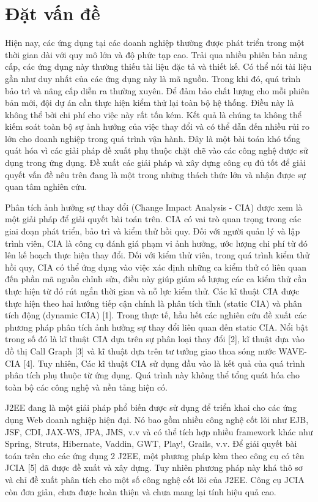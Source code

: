 \documentclass[12pt]{report}
\begin{document}
\chapter{Đặt vấn đề}
Hiện nay, các ứng dụng tại các doanh nghiệp thường được phát triển trong một thời gian
dài với quy mô lớn và độ phức tạp cao. Trải qua nhiều phiên bản nâng cấp, các ứng dụng
này thường thiếu tài liệu đặc tả và thiết kế. Có thể nói tài liệu gần như duy nhất của các
ứng dụng này là mã nguồn. Trong khi đó, quá trình bảo trì và nâng cấp diễn ra thường
xuyên. Để đảm bảo chất lượng cho mỗi phiên bản mới, đội dự án cần thực hiện kiểm thử
lại toàn bộ hệ thống. Điều này là không thể bởi chi phí cho việc này rất tốn kém. Kết quả
là chúng ta không thể kiếm soát toàn bộ sự ảnh hưởng của việc thay đổi và có thể dẫn đến
nhiều rủi ro lớn cho doanh nghiệp trong quá trình vận hành. Đây là một bài toán khó tổng
quát hóa vì các giải pháp đề xuất phụ thuộc chặt chẽ vào các công nghệ được sử dụng
trong ứng dụng. Đề xuất các giải pháp và xây dựng công cụ đủ tốt để giải quyết vấn đề
nêu trên đang là một trong những thách thức lớn và nhận được sự quan tâm nghiên cứu.

Phân tích ảnh hưởng sự thay đổi (Change Impact Analysis - CIA) được xem là một
giải pháp để giải quyết bài toán trên. CIA có vai trò quan trọng trong các giai đoạn phát
triển, bảo trì và kiểm thử hồi quy. Đối với người quản lý và lập trình viên, CIA là công cụ
đánh giá phạm vi ảnh hưởng, ước lượng chi phí từ đó lên kế hoạch thực hiện thay đổi.
Đối với kiểm thử viên, trong quá trình kiểm thử hồi quy, CIA có thể ứng dụng vào việc
xác định những ca kiểm thử có liên quan đến phần mã nguồn chỉnh sửa, điều này giúp
giảm số lượng các ca kiểm thử cần thực hiện từ đó rút ngắn thời gian và nỗ lực kiểm thử.
Các kĩ thuật CIA được thực hiện theo hai hướng tiếp cận chính là phân tích tĩnh (static
CIA) và phân tích động (dynamic CIA) [1]. Trong thực tế, hầu hết các nghiên cứu đề xuất
các phương pháp phân tích ảnh hưởng sự thay đổi liên quan đến static CIA. Nổi bật trong
số đó là kĩ thuật CIA dựa trên sự phân loại thay đổi [2], kĩ thuật dựa vào đồ thị Call
Graph [3] và kĩ thuật dựa trên tư tưởng giao thoa sóng nước WAVE-CIA [4]. Tuy nhiên,
Các kĩ thuật CIA sử dụng đầu vào là kết quả của quá trình phân tích phụ thuộc từ ứng
dụng. Quá trình này không thể tổng quát hóa cho toàn bộ các công nghệ và nền tảng hiện
có.

J2EE đang là một giải pháp phổ biến được sử dụng để triển khai cho các ứng dụng
Web doanh nghiệp hiện đại. Nó bao gồm nhiều công nghệ cốt lõi như EJB, JSF, CDI,
JAX-WS, JPA, JMS, v.v và có thể tích hợp nhiều framework khác như Spring, Struts,
Hibernate, Vaddin, GWT, Play!, Grails, v.v. Để giải quyết bài toán trên cho các ứng dụng 
2
J2EE, một phương pháp kèm theo công cụ có tên JCIA [5] đã được đề xuất và xây dựng.
Tuy nhiên phương pháp này khá thô sơ và chỉ đề xuất phân tích cho một số công nghệ cốt
lõi của J2EE. Công cụ JCIA còn đơn giản, chưa được hoàn thiện và chưa mang lại tính
hiệu quả cao.
\end{document}
